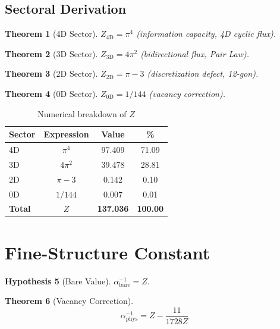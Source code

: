 \documentclass[12pt,a4paper]{article}
\numberwithin{equation}{section}
\theoremstyle{plain}
\newtheorem{theorem}{Theorem}[section]
\theoremstyle{definition}
\newtheorem{hypothesis}[theorem]{Hypothesis}
\theoremstyle{remark}
\newcommand{\Zed}{\ensuremath{Z}}
\newcommand{\Zdim}[1]{\ensuremath{Z_{\mathrm{#1}}}}
\begin{document}
\subsection{Sectoral Derivation}

\begin{theorem}[4D Sector]
$\Zdim{4D} = \pi^4$ (information capacity, 4D cyclic flux).
\end{theorem}

\begin{theorem}[3D Sector]
$\Zdim{3D} = 4\pi^2$ (bidirectional flux, Pair Law).
\end{theorem}

\begin{theorem}[2D Sector]
$\Zdim{2D} = \pi - 3$ (discretization defect, 12-gon).
\end{theorem}

\begin{theorem}[0D Sector]
$\Zdim{0D} = 1/144$ (vacancy correction).
\end{theorem}

\begin{table}[H]
\centering
\caption{Numerical breakdown of $\Zed$}
\begin{tabular}{lccc}
\toprule
\textbf{Sector} & \textbf{Expression} & \textbf{Value} & \textbf{\%} \\
\midrule
4D & $\pi^4$ & 97.409 & 71.09 \\
3D & $4\pi^2$ & 39.478 & 28.81 \\
2D & $\pi - 3$ & 0.142 & 0.10 \\
0D & $1/144$ & 0.007 & 0.01 \\
\midrule
\textbf{Total} & $\Zed$ & \textbf{137.036} & \textbf{100.00} \\
\bottomrule
\end{tabular}
\end{table}

\section{Fine-Structure Constant}

\begin{hypothesis}[Bare Value]
$\alpha^{-1}_{\mathrm{bare}} = \Zed$.
\end{hypothesis}

\begin{theorem}[Vacancy Correction]
\[
\boxed{\alpha^{-1}_{\mathrm{phys}} = \Zed - \frac{11}{1728\Zed}}
\]
\end{theorem}
\end{document}
